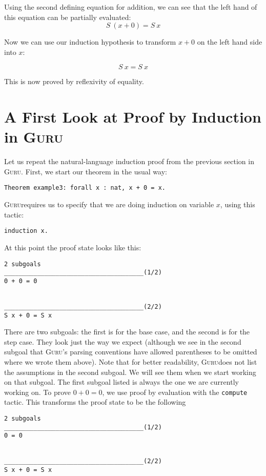 \documentclass{book}[12pt]
\newcommand{\guru}[0]{\textsc{Guru}}
\begin{document}
\noindent Using the second defining equation for addition, we can see
that the left hand of this equation can be partially evaluated:
\[S\ (x + 0) = S\ x\]

\noindent Now we can use our induction hypothesis to transform
$x + 0$ on the left hand side into $x$:

\[S\ x = S\ x\]

\noindent This is now proved by reflexivity of equality.

\section{A First Look at Proof by Induction in \guru}

Let us repeat the natural-language induction proof from the previous
section in \guru.  First, we start our theorem in the usual way:

\begin{verbatim}
Theorem example3: forall x : nat, x + 0 = x.
\end{verbatim}

\noindent \guru requires us to specify that we are doing induction on
variable $x$, using this tactic:

\begin{verbatim}
induction x.
\end{verbatim}

\noindent At this point the proof state looks like this:

\begin{verbatim}
2 subgoals
______________________________________(1/2)
0 + 0 = 0


______________________________________(2/2)
S x + 0 = S x
\end{verbatim}

\noindent There are two subgoals: the first is for the base case, and
the second is for the step case.  They look just the way we expect
(although we see in the second subgoal that \guru's parsing conventions
have allowed parentheses to be omitted where we wrote them above).
Note that for better readability, \guru does not list the assumptions in
the second subgoal.  We will see them when we start working on that
subgoal.  The first subgoal listed is always the one we are currently
working on.  To prove $0+0 = 0$, we use proof by evaluation with
the \texttt{compute} tactic.  This transforms the proof state to be
the following

\begin{verbatim}
2 subgoals
______________________________________(1/2)
0 = 0


______________________________________(2/2)
S x + 0 = S x
\end{verbatim}
\end{document}
